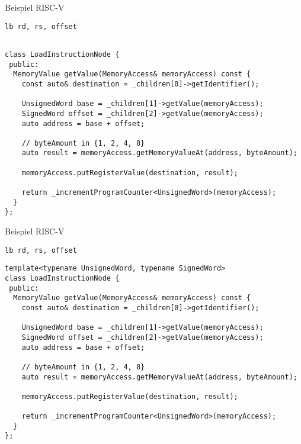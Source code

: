 \begin{frame}[fragile]{Beispiel RISC-V}
\begin{lstlisting}[style=risc-v_Assembler, basicstyle=\ttfamily\large]
                lb rd, rs, offset
\end{lstlisting}
\vspace{-0.2cm}
\pause
\begin{lstlisting}[style=C++]

class LoadInstructionNode {
 public:
  MemoryValue getValue(MemoryAccess& memoryAccess) const {
    const auto& destination = _children[0]->getIdentifier();

    UnsignedWord base = _children[1]->getValue(memoryAccess);
    SignedWord offset = _children[2]->getValue(memoryAccess);
    auto address = base + offset;

    // byteAmount in {1, 2, 4, 8}
    auto result = memoryAccess.getMemoryValueAt(address, byteAmount);

    memoryAccess.putRegisterValue(destination, result);

    return _incrementProgramCounter<UnsignedWord>(memoryAccess);
  }
};
\end{lstlisting}
\end{frame}

\begin{frame}[fragile]{Beispiel RISC-V}
\begin{lstlisting}[style=risc-v_Assembler, basicstyle=\ttfamily\large]
                lb rd, rs, offset
\end{lstlisting}
\vspace{-0.2cm}
\begin{lstlisting}[style=C++]
template<typename UnsignedWord, typename SignedWord>
class LoadInstructionNode {
 public:
  MemoryValue getValue(MemoryAccess& memoryAccess) const {
    const auto& destination = _children[0]->getIdentifier();

    UnsignedWord base = _children[1]->getValue(memoryAccess);
    SignedWord offset = _children[2]->getValue(memoryAccess);
    auto address = base + offset;

    // byteAmount in {1, 2, 4, 8}
    auto result = memoryAccess.getMemoryValueAt(address, byteAmount);

    memoryAccess.putRegisterValue(destination, result);

    return _incrementProgramCounter<UnsignedWord>(memoryAccess);
  }
};
\end{lstlisting}
\end{frame}


